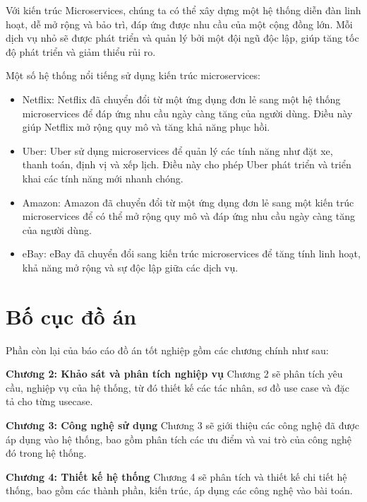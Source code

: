 \documentclass[../index.tex]{subfiles}
\begin{document}
    Với kiến trúc Microservices, chúng ta có thể xây dựng một hệ thống diễn đàn
    linh hoạt, dễ mở rộng và bảo trì, đáp ứng được nhu cầu của một cộng đồng lớn.
    Mỗi dịch vụ nhỏ sẽ được phát triển và quản lý bởi một đội ngũ độc lập, giúp
    tăng tốc độ phát triển và giảm thiểu rủi ro.

    Một số hệ thống nổi tiếng sử dụng kiến trúc microservices:
    \begin{itemize}
        \item Netflix: Netflix đã chuyển đổi từ một ứng dụng đơn lẻ sang một hệ thống microservices để đáp ứng nhu cầu ngày càng tăng của người dùng. Điều này giúp Netflix mở rộng quy mô và tăng khả năng phục hồi.
        \item Uber: Uber sử dụng microservices để quản lý các tính năng như đặt xe, thanh toán, định vị và xếp lịch. Điều này cho phép Uber phát triển và triển khai các tính năng mới nhanh chóng.
        \item Amazon: Amazon đã chuyển đổi từ một ứng dụng đơn lẻ sang một kiến trúc microservices để có thể mở rộng quy mô và đáp ứng nhu cầu ngày càng tăng của người dùng.
        \item eBay: eBay đã chuyển đổi sang kiến trúc microservices để tăng tính linh hoạt, khả năng mở rộng và sự độc lập giữa các dịch vụ.
    \end{itemize}

    \newpage
    
    \section{Bố cục đồ án}
    Phần còn lại của báo cáo đồ án tốt nghiệp gồm các chương chính như sau:

    \textbf{Chương 2: Khảo sát và phân tích nghiệp vụ}
    \newline
    \indent Chương 2 sẽ phân tích yêu cầu, nghiệp vụ của hệ thống, từ đó thiết kế các tác
    nhân, sơ đồ use case và đặc tả cho từng usecase.

    \textbf{Chương 3: Công nghệ sử dụng}
    \newline
    \indent Chương 3 sẽ giới thiệu các công nghệ đã được áp dụng vào hệ thống, bao gồm
    phân tích các ưu điểm và vai trò của công nghệ đó trong hệ thống.

    \textbf{Chương 4: Thiết kế hệ thống}
    \newline
    \indent Chương 4 sẽ phân tích và thiết kế chi tiết hệ thống, bao gồm các thành phần, kiến trúc, áp dụng các công nghệ vào bài toán.
\end{document}
